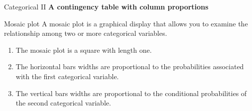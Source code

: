 \documentclass[12pt,a4paper]{beamer}
\begin{document}
\begin{frame}{Categorical II}
	\textbf{A contingency table with column proportions}
	\begin{table}[ht]
	
	\end{table}
\end{frame}
\begin{frame}{Mosaic plot}
	A mosaic plot is a graphical display that allows you to examine the relationship among two or more categorical variables. 
	\begin{enumerate}
	\item 	The mosaic plot is a square with length one. 
	\item The horizontal bars  widths are proportional to the probabilities associated with the first 
	categorical variable. 
	\item The vertical  bars widths are proportional to the 
	conditional probabilities of the second categorical variable. 
	\end{enumerate}
	
\end{frame}
\end{document}
